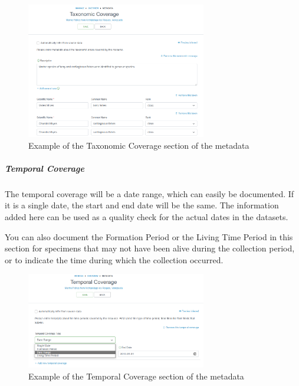 \documentclass[
  letterpaper,
  DIV=11,
  numbers=noendperiod,
  oneside]{scrreprt}
\let\oldsubparagraph\subparagraph
\renewcommand{\subparagraph}[1]{\oldsubparagraph{#1}\mbox{}}
\begin{document}
\begin{figure}

{\centering \includegraphics[width=0.7\textwidth,height=\textheight]{images/ipt-ss14-meta-taxa.png}

}

\caption{Example of the Taxonomic Coverage section of the metadata}

\end{figure}

\hypertarget{temporal-coverage}{%
\subparagraph{Temporal Coverage}\label{temporal-coverage}}

The temporal coverage will be a date range, which can easily be
documented. If it is a single date, the start and end date will be the
same. The information added here can be used as a quality check for the
actual dates in the datasets.

You can also document the Formation Period or the Living Time Period in
this section for specimens that may not have been alive during the
collection period, or to indicate the time during which the collection
occurred.

\begin{figure}

{\centering \includegraphics[width=0.7\textwidth,height=\textheight]{images/ipt-ss15-meta-time.png}

}

\caption{Example of the Temporal Coverage section of the metadata}

\end{figure}
\end{document}

